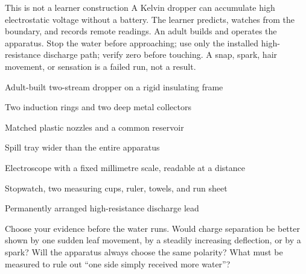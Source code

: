 



\begin{teloshazard}{This is not a learner construction}
A Kelvin dropper can accumulate high electrostatic voltage without a battery.
The learner predicts, watches from the boundary, and records remote readings.
An adult builds and operates the apparatus. Stop the water before approaching;
use only the installed high-resistance discharge path; verify zero before
touching. A snap, spark, hair movement, or sensation is a failed run, not a
result.
\end{teloshazard}

\begin{materials}
\item Adult-built two-stream dropper on a rigid insulating frame
\item Two induction rings and two deep metal collectors
\item Matched plastic nozzles and a common reservoir
\item Spill tray wider than the entire apparatus
\item Electroscope with a fixed millimetre scale, readable at a distance
\item Stopwatch, two measuring cups, ruler, towels, and run sheet
\item Permanently arranged high-resistance discharge lead
\end{materials}

\begin{predict}
Choose your evidence before the water runs. Would charge separation be better
shown by one sudden leaf movement, by a steadily increasing deflection, or by a
spark? Will the apparatus always choose the same polarity? What must be measured
to rule out ``one side simply received more water''?
\end{predict}


